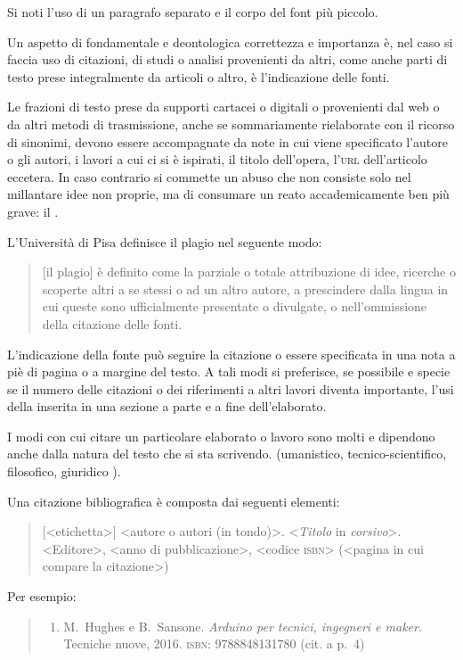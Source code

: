 Si noti l'uso di un paragrafo separato e il corpo del font più piccolo.

Un aspetto di fondamentale e deontologica correttezza e importanza è, nel caso si faccia uso di citazioni, di studi o analisi provenienti da altri, come anche parti di testo prese integralmente da articoli o altro, è l'indicazione delle fonti.

Le frazioni di testo prese da supporti cartacei o digitali o provenienti dal web o da altri metodi di trasmissione, anche se sommariamente rielaborate con il ricorso di sinonimi, devono essere accompagnate da note in cui viene specificato l'autore o gli autori, i lavori a cui ci si è ispirati, il titolo dell'opera, l'\textsc{url} dell'articolo eccetera. In caso contrario si commette un abuso che non consiste solo nel millantare idee non proprie, ma di consumare un reato accademicamente ben più grave: il .

L'Università di Pisa definisce il plagio nel seguente modo:

                  \begin{quote}
										[il plagio] è definito come la parziale o totale attribuzione di idee, ricerche o scoperte altri a se stessi o ad un altro autore, a prescindere dalla lingua in cui queste sono ufficialmente presentate o divulgate, o nell'ommissione della citazione delle fonti.
                  \end{quote}

L'indicazione della fonte può seguire la citazione o essere specificata in una nota a piè di pagina o a margine del testo. A tali modi si preferisce, se possibile e specie se il numero delle citazioni o dei riferimenti a altri lavori diventa importante, l'usi della  inserita in una sezione a parte e a fine dell'elaborato.

I modi con cui citare un particolare elaborato o lavoro sono molti e dipendono anche dalla natura del testo che si sta scrivendo. (umanistico, tecnico-scientifico, filosofico, giuridico \ecc).

Una citazione bibliografica è composta dai seguenti elementi:

\begin{quotation}\small
 [<etichetta>] <autore o autori (in tondo)>. <\textit{Titolo} in \textit{corsivo}>. <Editore>, <anno di pubblicazione>, <codice \textsc{isbn}> (<pagina in cui compare la citazione>)
\end{quotation}

Per esempio:
		\begin{quote}\small
			\begin{enumerate}[leftmargin=20mm]
				\item[$\textlbrackdbl$HS16$\textrbrackdbl$] M.~Hughes e B.~Sansone. \textit{Arduino per tecnici, ingegneri e maker}. Tecniche nuove, 2016. \textsc{isbn}: 9788848131780 (cit. a p.~4)
			\end{enumerate}
		\end{quote}

